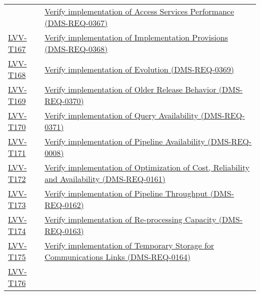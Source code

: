 \begin{longtable}[]{@{}ll@{}}
&
\href{https://jira.lsstcorp.org/secure/Tests.jspa\#/testCase/LVV-T166}{Verify
implementation of Access Services Performance
(DMS-REQ-0367)}\tabularnewline
\protect\hyperlink{lvv-t167---verify-implementation-of-implementation-provisions-dms-req-0368}{LVV-T167}
&
\href{https://jira.lsstcorp.org/secure/Tests.jspa\#/testCase/LVV-T167}{Verify
implementation of Implementation Provisions
(DMS-REQ-0368)}\tabularnewline
\protect\hyperlink{lvv-t168---verify-implementation-of-evolution-dms-req-0369}{LVV-T168}
&
\href{https://jira.lsstcorp.org/secure/Tests.jspa\#/testCase/LVV-T168}{Verify
implementation of Evolution (DMS-REQ-0369)}\tabularnewline
\protect\hyperlink{lvv-t169---verify-implementation-of-older-release-behavior-dms-req-0370}{LVV-T169}
&
\href{https://jira.lsstcorp.org/secure/Tests.jspa\#/testCase/LVV-T169}{Verify
implementation of Older Release Behavior (DMS-REQ-0370)}\tabularnewline
\protect\hyperlink{lvv-t170---verify-implementation-of-query-availability-dms-req-0371}{LVV-T170}
&
\href{https://jira.lsstcorp.org/secure/Tests.jspa\#/testCase/LVV-T170}{Verify
implementation of Query Availability (DMS-REQ-0371)}\tabularnewline
\protect\hyperlink{lvv-t171---verify-implementation-of-pipeline-availability-dms-req-0008}{LVV-T171}
&
\href{https://jira.lsstcorp.org/secure/Tests.jspa\#/testCase/LVV-T171}{Verify
implementation of Pipeline Availability (DMS-REQ-0008)}\tabularnewline
\protect\hyperlink{lvv-t172---verify-implementation-of-optimization-of-cost-reliability-and-availability-dms-req-0161}{LVV-T172}
&
\href{https://jira.lsstcorp.org/secure/Tests.jspa\#/testCase/LVV-T172}{Verify
implementation of Optimization of Cost, Reliability and Availability
(DMS-REQ-0161)}\tabularnewline
\protect\hyperlink{lvv-t173---verify-implementation-of-pipeline-throughput-dms-req-0162}{LVV-T173}
&
\href{https://jira.lsstcorp.org/secure/Tests.jspa\#/testCase/LVV-T173}{Verify
implementation of Pipeline Throughput (DMS-REQ-0162)}\tabularnewline
\protect\hyperlink{lvv-t174---verify-implementation-of-re-processing-capacity-dms-req-0163}{LVV-T174}
&
\href{https://jira.lsstcorp.org/secure/Tests.jspa\#/testCase/LVV-T174}{Verify
implementation of Re-processing Capacity (DMS-REQ-0163)}\tabularnewline
\protect\hyperlink{lvv-t175---verify-implementation-of-temporary-storage-for-communications-links-dms-req-0164}{LVV-T175}
&
\href{https://jira.lsstcorp.org/secure/Tests.jspa\#/testCase/LVV-T175}{Verify
implementation of Temporary Storage for Communications Links
(DMS-REQ-0164)}\tabularnewline
\protect\hyperlink{lvv-t176---verify-implementation-of-infrastructure-sizing-for-catching-up-dms-req-0165}{LVV-T176}

\end{longtable}
